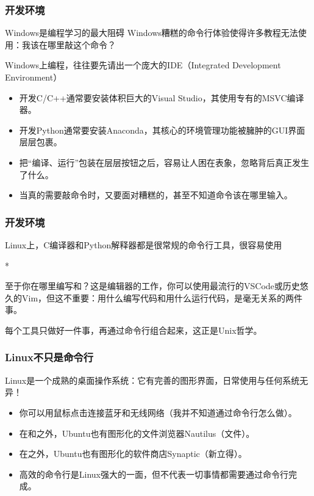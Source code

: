 \begin{frame}
    \frametitle{开发环境}
    \begin{vspquote}{Windows是编程学习的最大阻碍}
        Windows糟糕的命令行体验使得许多教程无法使用：我该在哪里敲这个命令？
    \end{vspquote}
    Windows上编程，往往要先请出一个庞大的\alert{IDE}（Integrated Development Environment）
    \begin{itemize}
        \item 开发C/C++通常要安装体积巨大的Visual Studio，其使用专有的MSVC编译器。
        \item 开发Python通常要安装Anaconda，其核心的环境管理功能被臃肿的GUI界面层层包裹。
        \item 把“编译、运行”包装在层层按钮之后，容易让人困在表象，忽略背后真正发生了什么。
        \item 当真的需要敲命令时，又要面对糟糕的，甚至不知道命令该在哪里输入。
    \end{itemize}
\end{frame}

\begin{frame}
    \frametitle{开发环境}
    Linux上，C编译器和Python解释器都是很常规的命令行工具，很容易使用
    \begin{Code}*
        
    \end{Code}
    至于你在哪里编写和？这是编辑器的工作，你可以使用最流行的VSCode或历史悠久的Vim，但这不重要：用什么编写代码和用什么运行代码，是毫无关系的两件事。

    每个工具只做好一件事，再通过命令行组合起来，这正是Unix哲学。
\end{frame}

\begin{frame}
    \frametitle{Linux不只是命令行}
    Linux是一个成熟的桌面操作系统：它有完善的图形界面，日常使用与任何系统无异！
    \begin{itemize}
        \item 你可以用鼠标点击连接蓝牙和无线网络（我并不知道通过命令行怎么做）。
        \item 在和之外，Ubuntu也有图形化的文件浏览器Nautilus（文件）。
        \item 在之外，Ubuntu也有图形化的软件商店Synaptic（新立得）。
        \item 高效的命令行是Linux强大的一面，但不代表一切事情都需要通过命令行完成。
    \end{itemize}
\end{frame}

